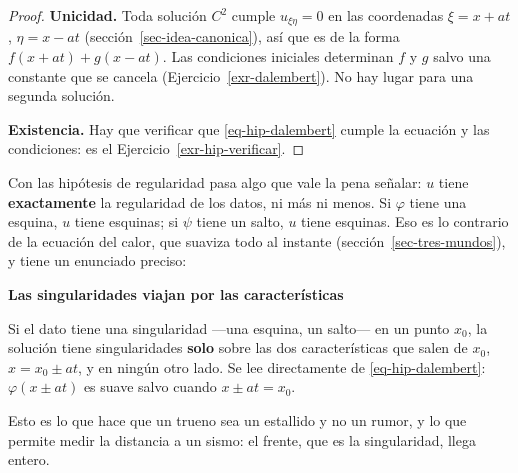 \documentclass[
  spanish,
  a4paper,
]{scrbook}
\theoremstyle{definition}
\theoremstyle{plain}
\theoremstyle{definition}
\theoremstyle{plain}
\theoremstyle{definition}
\theoremstyle{remark}
\begin{document}
\begin{proof}
\textbf{Unicidad.} Toda solución \(C^2\) cumple \(u_{\xi\eta}=0\) en las
coordenadas \(\xi=x+at\), \(\eta = x-at\)
(sección~\ref{sec-idea-canonica}), así que es de la forma
\(f(x+at)+g(x-at)\). Las condiciones iniciales determinan \(f\) y \(g\)
salvo una constante que se cancela (Ejercicio~\ref{exr-dalembert}). No
hay lugar para una segunda solución.

\textbf{Existencia.} Hay que verificar que \ref{eq-hip-dalembert} cumple
la ecuación y las condiciones: es el Ejercicio~\ref{exr-hip-verificar}.
\end{proof}

Con las hipótesis de regularidad pasa algo que vale la pena señalar:
\(u\) tiene \textbf{exactamente} la regularidad de los datos, ni más ni
menos. Si \(\varphi\) tiene una esquina, \(u\) tiene esquinas; si
\(\psi\) tiene un salto, \(u\) tiene esquinas. Eso es lo contrario de la
ecuación del calor, que suaviza todo al instante
(sección~\ref{sec-tres-mundos}), y tiene un enunciado preciso:

\begin{tcolorbox}[enhanced jigsaw, arc=.35mm, bottomrule=.15mm, breakable, colback=white, colframe=quarto-callout-important-color-frame, left=2mm, leftrule=.75mm, opacityback=0, rightrule=.15mm, toprule=.15mm]
\begin{minipage}[t]{5.5mm}
\textcolor{quarto-callout-important-color}{\faExclamation}
\end{minipage}%
\begin{minipage}[t]{\textwidth - 5.5mm}

\vspace{-3mm}\textbf{Las singularidades viajan por las características}\vspace{3mm}

Si el dato tiene una singularidad ---una esquina, un salto--- en un
punto \(x_0\), la solución tiene singularidades \textbf{solo} sobre las
dos características que salen de \(x_0\), \(x = x_0 \pm at\), y en
ningún otro lado. Se lee directamente de \ref{eq-hip-dalembert}:
\(\varphi(x\pm at)\) es suave salvo cuando \(x\pm at = x_0\).

Esto es lo que hace que un trueno sea un estallido y no un rumor, y lo
que permite medir la distancia a un sismo: el frente, que es la
singularidad, llega entero.

\end{minipage}%
\end{tcolorbox}
\end{document}

